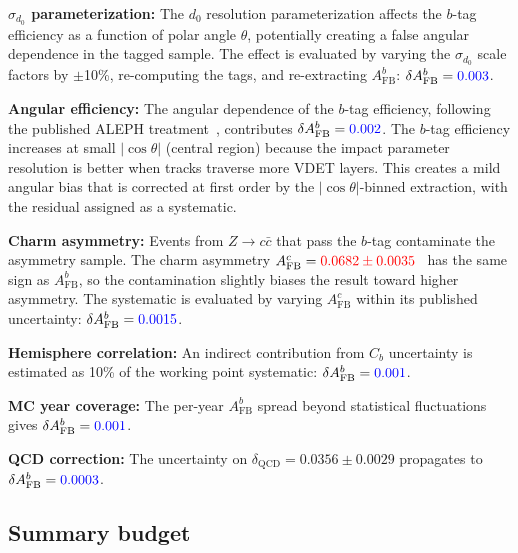 \documentclass[11pt,a4paper]{article}
\newcommand{\measured}[1]{\textcolor{blue}{#1}}
\newcommand{\external}[1]{\textcolor{red}{#1}}
\begin{document}
\textbf{$\sigma_{d_0}$ parameterization:}
The $d_0$ resolution parameterization affects the $b$-tag efficiency
as a function of polar angle $\theta$, potentially creating a false
angular dependence in the tagged sample.  The effect is evaluated by
varying the $\sigma_{d_0}$ scale factors by $\pm$10\%, re-computing the
tags, and re-extracting $A_\mathrm{FB}^b$:
$\delta A_\mathrm{FB}^b = \measured{0.003}$.

\textbf{Angular efficiency:}
The angular dependence of the $b$-tag efficiency, following the published
ALEPH treatment~\cite{LEP:EWWG:2005}, contributes
$\delta A_\mathrm{FB}^b = \measured{0.002}$.  The $b$-tag efficiency
increases at small $|\cos\theta|$ (central region) because the impact
parameter resolution is better when tracks traverse more VDET layers.
This creates a mild angular bias that is corrected at first order by
the $|\cos\theta|$-binned extraction, with the residual assigned as
a systematic.

\textbf{Charm asymmetry:}
Events from $Z \to c\bar{c}$ that pass the $b$-tag contaminate the
asymmetry sample.  The charm asymmetry
$A_\mathrm{FB}^c = \external{0.0682 \pm 0.0035}$~\cite{LEP:EWWG:2005}
has the same sign as $A_\mathrm{FB}^b$, so the contamination slightly
biases the result toward higher asymmetry.  The systematic is evaluated
by varying $A_\mathrm{FB}^c$ within its published uncertainty:
$\delta A_\mathrm{FB}^b = \measured{0.0015}$.

\textbf{Hemisphere correlation:}
An indirect contribution from $C_b$ uncertainty is estimated as 10\% of
the working point systematic:
$\delta A_\mathrm{FB}^b = \measured{0.001}$.

\textbf{MC year coverage:}
The per-year $A_\mathrm{FB}^b$ spread beyond statistical fluctuations
gives $\delta A_\mathrm{FB}^b = \measured{0.001}$.

\textbf{QCD correction:}
The uncertainty on $\delta_\mathrm{QCD} = 0.0356 \pm 0.0029$ propagates
to $\delta A_\mathrm{FB}^b = \measured{0.0003}$.

\subsection{Summary budget}
\end{document}
